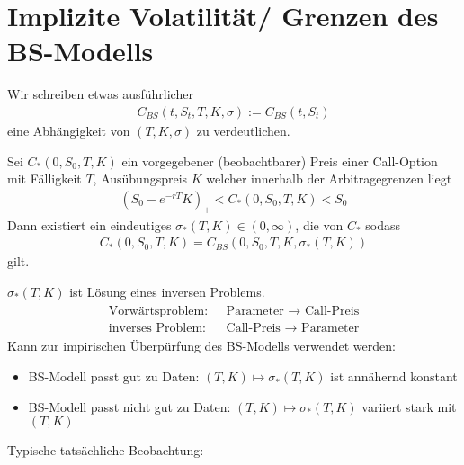 \section{Implizite Volatilität/ Grenzen des BS-Modells}
Wir schreiben etwas ausführlicher
\begin{align*}
C_{BS}(t,S_t, T, K, \sigma) := C_{BS}(t, S_t)
\end{align*}
eine Abhängigkeit von $(T,K,\sigma)$ zu verdeutlichen.
\begin{theorem} %
	Sei $C_{\ast}(0,S_0,T, K)$ ein vorgegebener (beobachtbarer) Preis einer Call-Option mit Fälligkeit $T$, Ausübungspreis $K$ welcher innerhalb der Arbitragegrenzen liegt
	\begin{align*}
	(S_0 - e^{-rT}K)_+ < C_{\ast}(0,S_0, T,K) < S_0
	\end{align*}
	Dann existiert ein eindeutiges $\sigma_{\ast}(T, K) \in (0,\infty)$, die  von $C_{\ast}$ sodass
	\begin{align*}
	C_{\ast}(0,S_0, T,K) = C_{BS}(0,S_0,T,K, \sigma_{\ast}(T,K))
	\end{align*}
	gilt.
\end{theorem}
\begin{*remark}
	$\sigma_{\ast}(T,K)$ ist Lösung eines inversen Problems.
	\begin{align*}
	\begin{matrix}
	\text{Vorwärtsproblem: } & \text{ Parameter }\to \text{ Call-Preis}\\
	\text{inverses Problem: } & \text{ Call-Preis }\to \text{ Parameter}
	\end{matrix}
	\end{align*}
	Kann zur impirischen Überpürfung des BS-Modells verwendet werden:
	\begin{itemize}
		\item BS-Modell passt gut zu Daten: $(T,K) \mapsto \sigma_{\ast}(T,K)$ ist annähernd konstant
		\item BS-Modell passt nicht gut zu Daten: $(T,K) \mapsto \sigma_{\ast}(T,K)$ variiert stark mit $(T,K)$
	\end{itemize}
\end{*remark}
Typische tatsächliche Beobachtung:
